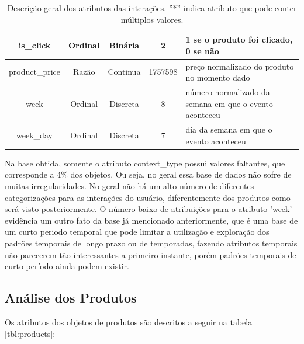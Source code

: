 \documentclass{article}
\begin{document}
\begin{table}[!hbt]
{\begin{tabular}{|c|c|c|c|p{7cm}|}
      is\_click            & Ordinal & Binária       & 2                & 1 se o produto foi clicado, 0 se não\\\hline
      product\_price       & Razão   & Continua      & 1757598          & preço normalizado do produto no momento dado\\\hline
      week                 & Ordinal & Discreta      & 8                & número normalizado da semana em que o evento aconteceu\\\hline
      week\_day            & Ordinal & Discreta      & 7                & dia da semana em que o evento aconteceu\\\hline
\end{tabular}}
   \caption{Descrição geral dos atributos das interações. ''*'' indica atributo que pode conter múltiplos valores.}
   \label{tbl:inter}
\end{table}

Na base obtida, somente o atributo context\_type possui valores faltantes, que corresponde a 4\% dos objetos. Ou seja, no geral essa base de dados não sofre de muitas irregularidades. No geral não há um alto número de diferentes categorizações para as interações do usuário, diferentemente dos produtos como será visto posteriormente. O número baixo de atribuições para o atributo 'week' evidência um outro fato da base já mencionado anteriormente, que é uma base de um curto periodo temporal que pode limitar a utilização e exploração dos padrões temporais de longo prazo ou de temporadas, fazendo atributos temporais não parecerem tão interessantes a primeiro instante, porém padrões temporais de curto período ainda podem existir.

\subsection{Análise dos Produtos}

Os atributos dos objetos de produtos são descritos a seguir na tabela \ref{tbl:products}:
\end{document}
